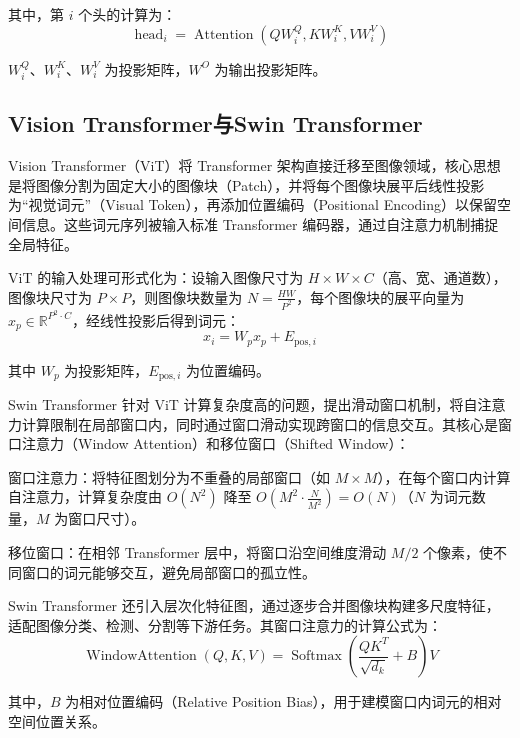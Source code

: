 \documentclass{xduugthesis}
\begin{document}
其中，第 $i$ 个头的计算为：
\begin{equation}
\operatorname{head}_{i} = \operatorname{Attention}(QW^{Q}_{i}, KW^{K}_{i}, VW^{V}_{i})
\end{equation}

$W^{Q}_{i}$、$W^{K}_{i}$、$W^{V}_{i}$ 为投影矩阵，$W^{O}$ 为输出投影矩阵。

\subsection{Vision Transformer与Swin Transformer}
Vision Transformer（ViT）将 Transformer 架构直接迁移至图像领域，核心思想是将图像分割为固定大小的图像块（Patch），并将每个图像块展平后线性投影为“视觉词元”（Visual Token），再添加位置编码（Positional Encoding）以保留空间信息。这些词元序列被输入标准 Transformer 编码器，通过自注意力机制捕捉全局特征。

ViT 的输入处理可形式化为：设输入图像尺寸为 $H \times W \times C$（高、宽、通道数），图像块尺寸为 $P \times P$，则图像块数量为 $N = \frac{HW}{P^2}$，每个图像块的展平向量为 $x_p \in \mathbb{R}^{P^2 \cdot C}$，经线性投影后得到词元：
\begin{equation}
    x_i = W_p x_p + E_{\text{pos},i}
\end{equation}

其中 $W_p$ 为投影矩阵，$E_{\text{pos},i}$ 为位置编码。

Swin Transformer 针对 ViT 计算复杂度高的问题，提出滑动窗口机制，将自注意力计算限制在局部窗口内，同时通过窗口滑动实现跨窗口的信息交互。其核心是窗口注意力（Window Attention）和移位窗口（Shifted Window）：

窗口注意力：将特征图划分为不重叠的局部窗口（如 $M \times M$），在每个窗口内计算自注意力，计算复杂度由 $O(N^2)$ 降至 $O(M^2 \cdot \frac{N}{M^2}) = O(N)$（$N$ 为词元数量，$M$ 为窗口尺寸）。

移位窗口：在相邻 Transformer 层中，将窗口沿空间维度滑动 $M/2$ 个像素，使不同窗口的词元能够交互，避免局部窗口的孤立性。

Swin Transformer 还引入层次化特征图，通过逐步合并图像块构建多尺度特征，适配图像分类、检测、分割等下游任务。其窗口注意力的计算公式为：
\begin{equation}
    \operatorname{WindowAttention}(Q, K, V) = \operatorname{Softmax}\left(\frac{QK^T}{\sqrt{d_k}} + B\right) V
\end{equation}

其中，$B$ 为相对位置编码（Relative Position Bias），用于建模窗口内词元的相对空间位置关系。
\end{document}
